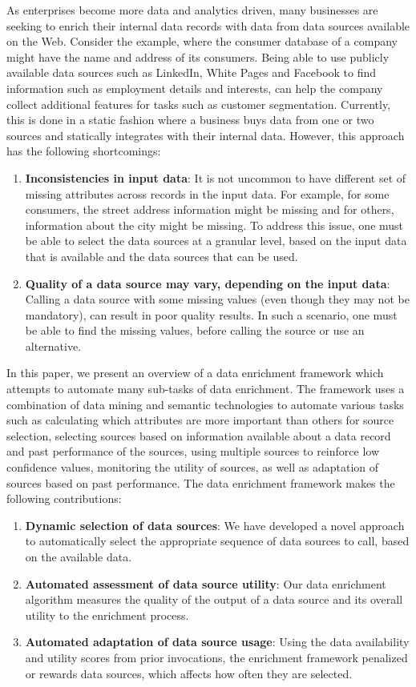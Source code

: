 As enterprises become more data and analytics driven, many businesses are seeking to enrich their internal data records with data from data sources available on the Web. Consider the example, where the consumer database of a company might have the name and address of its consumers.  Being able to use publicly available data sources such as LinkedIn, White Pages and Facebook to find information such as employment details and interests, can help the company collect additional features for tasks such as customer segmentation. Currently, this is done in a static fashion where a business buys data from one or two sources and statically integrates with their internal data. However, this approach has the following shortcomings:
\begin{enumerate}
  \item \textbf{Inconsistencies in input data}: It is not uncommon to have different set of missing attributes across records in the input data. For example, for some consumers, the street address information might be missing and for others, information about the city might be missing. To address this issue, one must be able to select the data sources at a granular level, based on the input data that is available and the data sources that can be used.
   \item \textbf{Quality of a data source may vary, depending on the input data}: Calling a data source with some missing values (even though they may not be mandatory), can result in poor quality results. In such a scenario, one must be able to find the missing values, before calling the source or use an alternative.
\end{enumerate}
In this paper, we present an overview of a data enrichment framework which attempts to automate many sub-tasks of data enrichment. The framework uses a combination of data mining and semantic technologies to automate various tasks such as calculating which attributes are more important than others for source selection, selecting sources based on information available about a data record and past performance of the sources, using multiple sources to reinforce low confidence values, monitoring the utility of sources, as well as adaptation of sources based on past performance. The data enrichment framework makes the following contributions:
\begin{enumerate}
  \item \textbf{Dynamic selection of data sources}: We have developed a novel approach to automatically select the appropriate sequence of data sources to call, based on the available data.
  \item \textbf{Automated assessment of data source utility}: Our data enrichment algorithm measures the quality of the output of a data source and its overall utility to the enrichment process.
  \item \textbf{Automated adaptation of data source usage}: Using the data availability and utility scores from prior invocations, the enrichment framework penalized or rewards data sources, which affects how often they are selected.
\end{enumerate}


